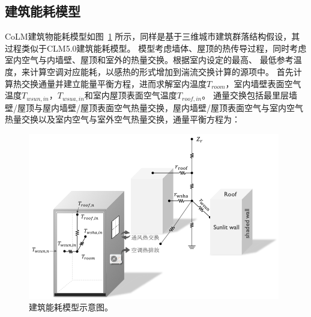 \subsection{建筑能耗模型}
CoLM建筑物能耗模型如图~\ref{fig:建筑能耗模型示意图} 所示，同样是基于三维城市建筑群落结构假设，其过程类似于CLM5.0建筑能耗模型。
模型考虑墙体、屋顶的热传导过程，同时考虑室内空气与内墙壁、屋顶和室外的热量交换。根据室内设定的最高、
最低参考温度，来计算空调对应能耗，以感热的形式增加到湍流交换计算的源项中。
首先计算热交换通量并建立能量平衡方程，进而求解室内温度$T_{room}$，室内墙壁表面空气温度$T_{wsun,in}$，$T_{wsua,in}$和室内屋顶表面空气温度$T_{roof,in}$。
通量交换包括最里层墙壁/屋顶与屋内墙壁/屋顶表面空气热量交换，屋内墙壁/屋顶表面空气与室内空气热量交换以及室内空气与室外空气热量交换，通量平衡方程为： 
{
\begin{figure}[]
\centering
\includegraphics{Figures/城市模式/建筑能耗模型示意图.png}
\caption{建筑能耗模型示意图。}
\label{fig:建筑能耗模型示意图}
\end{figure}
}

